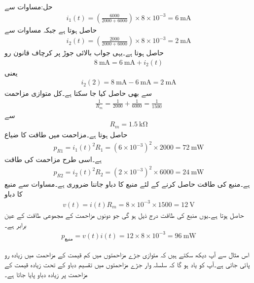 حل:مساوات  سے
\begin{align*}
i_1(t)=\left(\frac{6000}{2000+6000}\right)  \times 8\times 10^{-3} =\SI{6}{\milli\ampere}
\end{align*}
حاصل ہوتا ہے جبکہ مساوات  سے
\begin{align*}
i_2(t)=\left(\frac{2000}{2000+6000}\right) \times 8\times 10^{-3}=\SI{2}{\milli\ampere}
\end{align*}
حاصل ہوتا ہے۔یہی جواب بالائی جوڑ پر کرچاف قانون رو
\begin{align*}
\SI{8}{\milli\ampere}=\SI{6}{\milli\ampere}+i_2(t)
\end{align*}
یعنی
\begin{align*}
i_2(2)=\SI{8}{\milli\ampere}-\SI{6}{\milli\ampere}=\SI{2}{\milli\ampere}
\end{align*}
سے بھی حاصل کیا جا سکتا ہے۔کل متوازی مزاحمت
\begin{align*}
\frac{1}{R_m}=\frac{1}{2000}+\frac{1}{6000}=\frac{1}{1500}
\end{align*}
سے 
\begin{align*}
R_m=\SI{1.5}{\kilo\ohm}
\end{align*}
حاصل ہوتا ہے۔مزاحمت  میں طاقت کا ضیاع
\begin{align*}
p_{R1}=i_1(t)^2 R_1=(6\times 10^{-3})^2  \times 2000=\SI{72}{\milli\watt}
\end{align*}
ہے۔اسی طرح مزاحمت  کی طاقت
\begin{align*}
p_{R2}=i_2(t)^2 R_2=(2\times 10^{-3})^2  \times 6000=\SI{24}{\milli\watt}
\end{align*}
ہے۔منبع کی طاقت حاصل کرنے کے لئے منبع کا دباو جاننا ضروری ہے۔مساوات  سے  منبع کا دباو
\begin{align*}
v(t)=i(t) R_m=8\times 10^{-3}\times 1500=\SI{12}{\volt} 
\end{align*}
حاصل ہوتا ہے۔یوں منبع کی طاقت درج ذیل ہو گی جو دونوں مزاحمت کے مجموعی طاقت کے  عین برابر ہے۔
\begin{align*}
p_{\text{منبع}}=v(t) i(t)=12\times 8\times 10^{-3}=\SI{96}{\milli\watt}
\end{align*}

اس مثال سے آپ دیکھ سکتے ہیں کہ متوازی جڑے مزاحمتوں میں کم قیمت کے مزاحمت میں زیادہ رو پائی جاتی ہے۔آپ کو یاد ہو گا کہ سلسلہ وار جڑے مزاحمتوں میں تقسیم دباو کے تحت زیادہ قیمت کے مزاحمت پر زیادہ دباو پایا جاتا ہے۔

